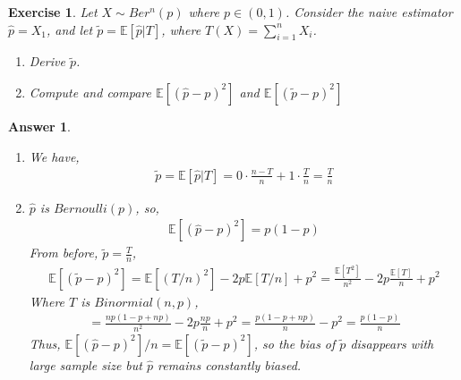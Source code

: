 \documentclass[12pt]{article}
\theoremstyle{colon}
\newtheorem{exercise}{Exercise}
\newtheorem*{answer}{Answer}
\begin{document}
\clearpage

\begin{exercise}
  Let $X \sim Ber^n(p)$ where $p \in (0,1)$. Consider the naive estimator $\widehat{p} = X_1$, and let $\tilde{p} = \mathbb{E}[\widehat{p} | T]$, where $T(X) = \sum_{i=1}^n X_i$.
  \begin{enumerate}[label=\arabic*)]
    \item Derive $\tilde{p}$.
    \item Compute and compare $\mathbb{E}[(\widehat{p}-p)^2]$ and $\mathbb{E}[(\tilde{p}-p)^2]$
  \end{enumerate}
\end{exercise}

\begin{answer}
  \leavevmode
  \begin{enumerate}[label=\arabic*)]
    \item We have,
      \begin{gather*}
        \tilde{p} = \mathbb{E}[\widehat{p} | T] = 0 \cdot \frac{n-T}{n} + 1 \cdot \frac{T}{n} = \frac{T}{n}
      \end{gather*}
    \item
      $\widehat{p}$ is $Bernoulli(p)$, so,
      \begin{gather*}
        \mathbb{E}[(\widehat{p}-p)^2] = p(1-p)
      \end{gather*}
      From before, $\tilde{p} = \frac{T}{n}$,
      \begin{gather*}
        \mathbb{E}[(\tilde{p}-p)^2] = \mathbb{E}[(T/n)^2] - 2p \mathbb{E}[T/n] + p^2 = \frac{\mathbb{E}[T^2]}{n^2} - 2p \frac{\mathbb{E}[T]}{n} + p^2
      \end{gather*}
      Where $T$ is $Binormial(n,p)$,
      \begin{gather*}
        = \frac{np(1-p+np)}{n^2} -2p \frac{np}{n} + p^2 = \frac{p(1-p+np)}{n} - p^2 = \frac{p(1-p)}{n}
      \end{gather*}
      Thus, $\mathbb{E}[(\widehat{p}-p)^2]/n = \mathbb{E}[(\tilde{p}-p)^2]$, so the bias of $\tilde{p}$ disappears with large sample size but $\widehat{p}$ remains constantly biased.
  \end{enumerate}
\end{answer}

\clearpage
\end{document}

